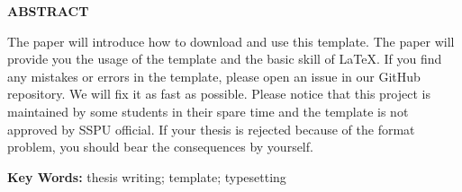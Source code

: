 \begin{center}
  \bfseries
  \titleEN
\end{center}

\begin{center}
  \bfseries
  ABSTRACT
\end{center}


The paper will introduce how to download and use this template.
The paper will provide you the usage of the template and the basic
skill of \LaTeX. If you find any mistakes or errors in the template,
please open an {\ttfamily issue} in our {\ttfamily GitHub} repository.
We will fix it as fast as possible. Please notice that this project is
maintained by some students in their spare time and the template is not
approved by SSPU official. If your thesis is rejected because of the format
problem, you should bear the consequences by yourself.

  {\noindent\bfseries Key Words: }
thesis writing; template; typesetting

\newpage

